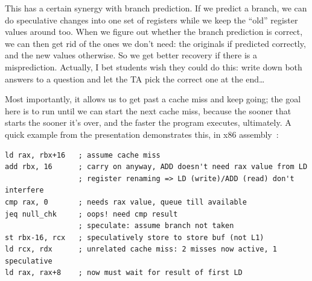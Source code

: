 \documentclass[a4paper]{report}
\begin{document}
This has a certain synergy with branch prediction. If we predict a branch, we can do speculative changes into one set of registers while we keep the ``old'' register values around too. When we figure out whether the branch prediction is correct, we can then get rid of the ones we don't need: the originals if predicted correctly, and the new values otherwise. So we get better recovery if there is a misprediction. Actually, I bet students wish they could do this: write down both answers to a question and let the TA pick the correct one at the end\ldots

Most importantly, it allows us to get past a cache miss and keep going; the goal here is to run until we can start the next cache miss, because the sooner that starts the sooner it's over, and the faster the program executes, ultimately. A quick example from the presentation demonstrates this, in x86 assembly~\cite{modern-hardware}:

\begin{verbatim}
ld rax, rbx+16   ; assume cache miss
add rbx, 16      ; carry on anyway, ADD doesn't need rax value from LD
                 ; register renaming => LD (write)/ADD (read) don't interfere
cmp rax, 0       ; needs rax value, queue till available
jeq null_chk     ; oops! need cmp result
                 ; speculate: assume branch not taken
st rbx-16, rcx   ; speculatively store to store buf (not L1)
ld rcx, rdx      ; unrelated cache miss: 2 misses now active, 1 speculative
ld rax, rax+8    ; now must wait for result of first LD
\end{verbatim}

\end{document}
